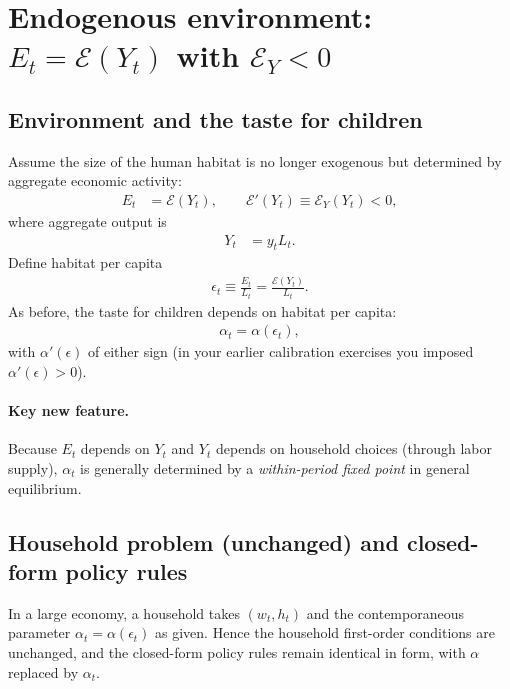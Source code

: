 \documentclass[11pt]{article}
\begin{document}
\section{Endogenous environment: $E_t = \mathcal{E}(Y_t)$ with $\mathcal{E}_Y<0$}

\subsection{Environment and the taste for children}
Assume the size of the human habitat is no longer exogenous but determined by aggregate economic activity:
\begin{align}
E_t &= \mathcal{E}(Y_t), \qquad \mathcal{E}'(Y_t)\equiv \mathcal{E}_Y(Y_t)<0,
\label{eq:E_endog}
\end{align}
where aggregate output is
\begin{align}
Y_t &= y_t L_t.
\label{eq:Y_agg_def}
\end{align}
Define habitat per capita
\begin{align}
\epsilon_t \equiv \frac{E_t}{L_t}=\frac{\mathcal{E}(Y_t)}{L_t}.
\label{eq:eps_endog}
\end{align}
As before, the taste for children depends on habitat per capita:
\begin{align}
\alpha_t=\alpha(\epsilon_t),
\label{eq:alpha_eps_endog}
\end{align}
with $\alpha'(\epsilon)$ of either sign (in your earlier calibration exercises you imposed $\alpha'(\epsilon)>0$).

\paragraph{Key new feature.}
Because $E_t$ depends on $Y_t$ and $Y_t$ depends on household choices (through labor supply), $\alpha_t$ is generally determined by a \emph{within-period fixed point} in general equilibrium.

\subsection{Household problem (unchanged) and closed-form policy rules}
In a large economy, a household takes $(w_t,h_t)$ and the contemporaneous parameter $\alpha_t=\alpha(\epsilon_t)$ as given.
Hence the household first-order conditions are unchanged, and the closed-form policy rules remain identical in form,
with $\alpha$ replaced by $\alpha_t$.
\end{document}
